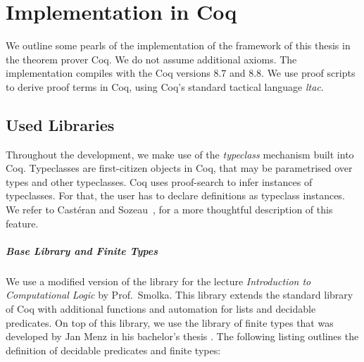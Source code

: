 \chapter{Implementation in Coq}
\label{chap:implementation}

\lstset{style=coq}


We outline some pearls of the implementation of the framework of this thesis in the theorem prover Coq.  We do not assume additional axioms.  The
implementation compiles with the Coq versions 8.7 and 8.8.  We use proof scripts to derive proof terms in Coq, using Coq's standard tactical language
\textit{ltac}.

\section{Used Libraries}
\label{sec:coq-libraries}

Throughout the development, we make use of the \textit{typeclass} mechanism built into Coq.  Typeclasses are first-citizen objects in Coq, that may be
parametrised over types and other typeclasses.  Coq uses proof-search to infer instances of typeclasses.  For that, the user has to declare
definitions as typeclass instances.  We refer to Cast{\'e}ran and Sozeau~\cite{casteran2012gentle}, for a more thoughtful description of this feature.

\paragraph{Base Library and Finite Types}

We use a modified version of the library for the lecture \textit{Introduction to Computational Logic} by Prof.\ Smolka.  This library extends the
standard library of Coq with additional functions and automation for lists and decidable predicates.  On top of this library, we use the library of
finite types that was developed by Jan Menz in his bachelor's thesis \cite{JanMenz}.  The following listing outlines the definition of decidable
predicates and finite types:


